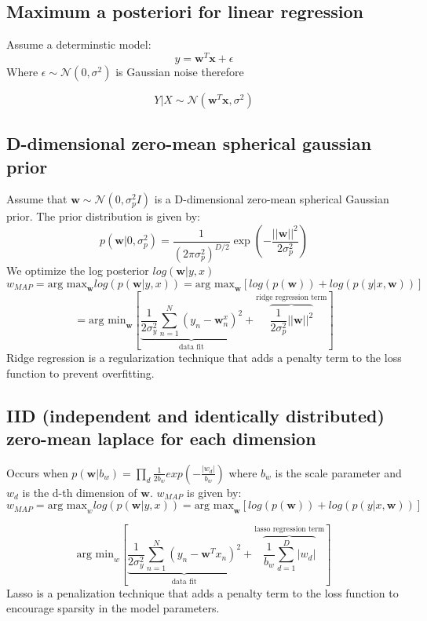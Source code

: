 \documentclass[12pt,a4paper]{article}
\begin{document}
\subsection{Maximum a posteriori for linear regression}
Assume a determinstic model:
$$y = \mathbf{w}^T \mathbf{x} + \epsilon$$
Where $\epsilon \sim \mathcal{N}(0, \sigma^2)$ is Gaussian noise therefore


\[
Y|X \sim \mathcal{N}(\mathbf{w}^T \mathbf{x}, \sigma^2)
\]

\subsection{D-dimensional zero-mean spherical gaussian prior}
Assume that $\mathbf{w} \sim \mathcal{N}(0, \sigma_p^2 I)$ is a D-dimensional zero-mean spherical Gaussian prior. The prior distribution is given by:
\[
p(\mathbf{w}|0, \sigma_p^2) = \frac{1}{(2\pi\sigma_p^2)^{D/2}} \exp\left(-\frac{||\mathbf{w}||^2}{2\sigma_p^2}\right)
\]
We optimize the log posterior $log(\mathbf{w} | y, x)$
\[
w_{MAP} = \text{arg max}_{\mathbf{w}}log(p(\mathbf{w}|y, x)) = \text{arg max}_{\mathbf{w}} \left[ log(p(\mathbf{w})) + log(p(y|x, \mathbf{w})) \right]
\]
\[
= \text{arg min}_{\mathbf{w}} \left[ \underbrace{\frac{1}{2\sigma^2_y} \sum_{n=1}^{N}(y_n - \mathbf{w}^ x_n)^2}_{\text{data fit}} + \overbrace{\frac{1}{2\sigma_p^2} ||\mathbf{w}||^2}^{\text{ridge regression term}} \right]
\]
Ridge regression is a regularization technique that adds a penalty term to the loss function to prevent overfitting.

\subsection{IID (independent and identically distributed) zero-mean laplace for each dimension}
Occurs when $p(\mathbf{w} | b_w) = \prod_{d}^{} \frac{1}{2b_w} exp(-\frac{|w_d|}{b_w})$
where $b_w$ is the scale parameter and $w_d$ is the d-th dimension of $\mathbf{w}$. $w_{MAP}$ is given by:
\[
w_{MAP} = \text{arg max}_{w} log(p(\mathbf{w}|y, x)) = \text{arg max}_{\mathbf{w}} \left[ log(p(\mathbf{w})) + log(p(y|x, \mathbf{w})) \right]
\]

\[
\text{arg min}_{w} \left[ \underbrace{\frac{1}{2\sigma^2_y} \sum_{n=1}^{N}(y_n - \mathbf{w}^T x_n)^2}_{\text{data fit}} + \overbrace{\frac{1}{b_w} \sum_{d=1}^{D} \mathbf|{w_d}|}^{\text{lasso regression term}} \right]
\]
Lasso is a penalization technique that adds a penalty term to the loss function to encourage sparsity in the model parameters.
\end{document}
